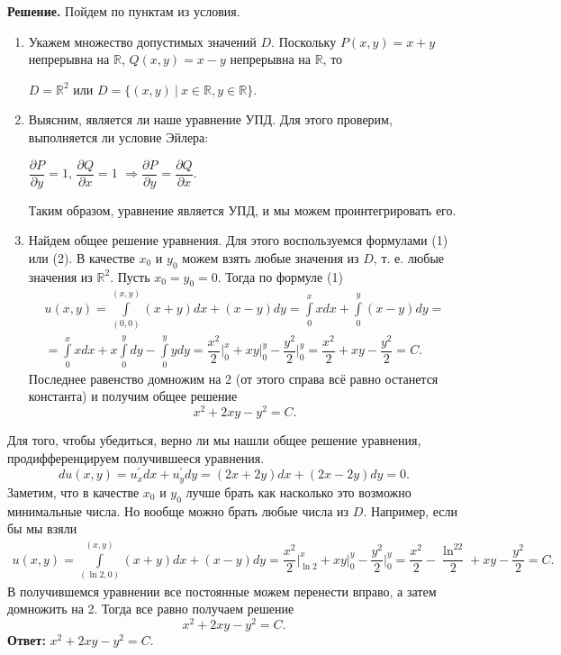 \documentclass[a4paper, 12pt]{article}
\newcommand{\Rm}{\mathbb{R}}
\renewcommand{\d}{\partial}
\begin{document}
\textbf{Решение.} Пойдем по пунктам из условия.\begin{enumerate}
	\item Укажем множество допустимых значений $D$. Поскольку $P(x,y) = x+y$ непрерывна на $\Rm$, $Q(x,y) = x-y$ непрерывна на $\Rm$, то \begin{center}
		$D = \Rm^2$ или $D = \{(x,y)\ |\ x\in\Rm, y\in\Rm\}$. 
	\end{center}
\item Выясним, является ли наше уравнение УПД. Для этого проверим, выполняется ли условие Эйлера:\begin{center}
	$\dfrac{\d P}{\d y} =1$, $\dfrac{\d Q}{\d x} = 1$ $\Rightarrow \dfrac{\d P}{\d y} = \dfrac{\d Q}{\d x}$.
\end{center}
Таким образом, уравнение является УПД, и мы можем проинтегрировать его.
\item Найдем общее решение уравнения. Для этого воспользуемся формулами (1) или (2). В качестве $x_0$ и $y_0$ можем взять любые значения из $D$, т. е. любые значения из $\Rm^2$. Пусть $x_0 = y_0 = 0$. Тогда по формуле (1)
\begin{multline*}
	u(x,y) = \int\limits^{(x,y)}_{(0,0)} (x+y)dx + (x-y)dy = \int\limits^x_0 xdx + \int\limits^y_0 (x-y)dy =\\= \int\limits^x_0 xdx + x\int\limits^y_0dy - \int\limits^y_0ydy  = \dfrac{x^2}{2}\Big|_0^x + xy \Big|_0^y - \dfrac{y^2}{2}\Big|_0^y = \dfrac{x^2}{2} + xy - \dfrac{y^2}{2} = C.
\end{multline*}
Последнее равенство домножим на 2 (от этого справа всё равно останется константа) и получим общее решение $$x^2 + 2xy - y^2 = C.$$
\end{enumerate}
Для того, чтобы убедиться, верно ли мы нашли общее решение уравнения, продифференцируем получившееся уравнения.
$$du(x,y) = u^\prime_xdx + u^\prime_ydy= (2x + 2y)dx + (2x - 2y)dy = 0.$$
Заметим, что в качестве $x_0$ и $y_0$ лучше брать как насколько это возможно минимальные числа. Но вообще можно брать любые числа из $D$. Например, если бы мы взяли \begin{multline*}
	u(x,y) = \int\limits^{(x,y)}_{(\ln2,0)} (x+y)dx + (x-y)dy = \dfrac{x^2}{2}\Big|_{\ln 2}^x + xy \Big|_{0}^y - \dfrac{y^2}{2}\Big|_{0}^y=\dfrac{x^2}{2} - \dfrac{\ln^22}{2}  + xy- \dfrac{y^2}{2} = C.
\end{multline*}
	В получившемся уравнении все постоянные можем перенести вправо, а затем домножить на 2. Тогда все равно получаем решение $$x^2 + 2xy - y^2 = C.$$
\textbf{Ответ:} $x^2 + 2xy - y^2 = C.$\\\\
\end{document}
